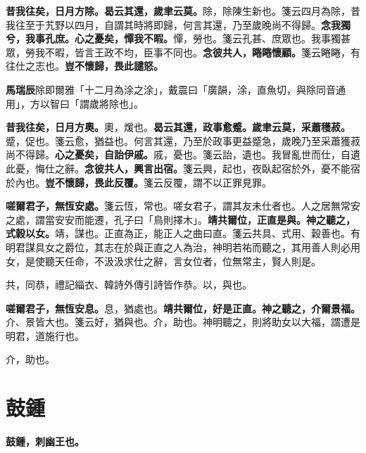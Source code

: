 \textbf{昔我往矣，日月方除。曷云其還，歲聿云莫。}{\footnotesize 除，除陳生新也。箋云四月為除，昔我往至于艽野以四月，自謂其時將即歸，何言其還，乃至歲晚尚不得歸。}\textbf{念我獨兮，我事孔庶。心之憂矣，憚我不暇。}{\footnotesize 憚，勞也。箋云孔甚、庶眾也。我事獨甚眾，勞我不暇，皆言王政不均，臣事不同也。}\textbf{念彼共人，睠睠懷顧。}{\footnotesize 箋云睠睠，有往仕之志也。}\textbf{豈不懷歸，畏此譴怒。}

\begin{quoting}\textbf{馬瑞辰}除即爾雅「十二月為涂之涂」，戴震曰「廣韻，涂，直魚切，與除同音通用」，方以智曰「謂歲將除也」。\end{quoting}

\textbf{昔我往矣，日月方奧。}{\footnotesize 奧，煖也。}\textbf{曷云其還，政事愈蹙。歲聿云莫，采蕭穫菽。}{\footnotesize 蹙，促也。箋云愈，猶益也。何言其還，乃至於政事更益蹙急，歲晚乃至采蕭獲菽尚不得歸。}\textbf{心之憂矣，自詒伊戚。}{\footnotesize 戚，憂也。箋云詒，遺也。我冒亂世而仕，自遺此憂，悔仕之辭。}\textbf{念彼共人，興言出宿。}{\footnotesize 箋云興，起也，夜臥起宿於外，憂不能宿於內也。}\textbf{豈不懷歸，畏此反覆。}{\footnotesize 箋云反覆，謂不以正罪見罪。}

\textbf{嗟爾君子，無恆安處。}{\footnotesize 箋云恆，常也。嗟女君子，謂其友未仕者也。人之居無常安之處，謂當安安而能遷，孔子曰「鳥則擇木」。}\textbf{靖共爾位，正直是與。神之聽之，式穀以女。}{\footnotesize 靖，謀也。正直為正，能正人之曲曰直。箋云共具、式用、穀善也。有明君謀具女之爵位，其志在於與正直之人為治，神明若祐而聽之，其用善人則必用女，是使聽天任命，不汲汲求仕之辭，言女位者，位無常主，賢人則是。}

\begin{quoting}共，同恭，禮記緇衣、韓詩外傳引詩皆作恭。以，與也。\end{quoting}

\textbf{嗟爾君子，無恆安息。}{\footnotesize 息，猶處也。}\textbf{靖共爾位，好是正直。神之聽之，介爾景福。}{\footnotesize 介、景皆大也。箋云好，猶與也。介，助也。神明聽之，則將助女以大福，謂遭是明君，道施行也。}

\begin{quoting}介，助也。\end{quoting}

\section{鼓鍾}


\textbf{鼓鍾，刺幽王也。}

